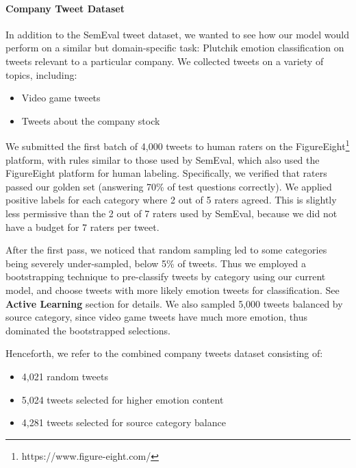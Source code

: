 \documentclass[letterpaper]{article} \usepackage{aaai19}  \usepackage{times}  \usepackage{helvet}  \usepackage{courier}  \usepackage{url}  \usepackage{graphicx}  \usepackage{booktabs}
\begin{document}
\paragraph{Company Tweet Dataset}
In addition to the SemEval tweet dataset, we wanted to see how our model would perform on a similar but domain-specific task: Plutchik emotion classification on tweets relevant to a particular company. We collected tweets on a variety of topics, including:
\begin{itemize}
    \itemsep0em
    \item Video game tweets
    \item Tweets about the company stock
\end{itemize}



We submitted the first batch of 4,000 tweets to human raters on the FigureEight\footnote{https://www.figure-eight.com/} platform, with rules similar to those used by SemEval, which also used the FigureEight platform for human labeling. Specifically, we verified that raters passed our golden set (answering 70\% of test questions correctly). We applied positive labels for each category where 2 out of 5 raters agreed. This is slightly less permissive than the 2 out of 7 raters used by SemEval, because we did not have a budget for 7 raters per tweet.

After the first pass, we noticed that random sampling led to some categories being severely under-sampled, below 5\% of tweets.
Thus we employed a bootstrapping technique to pre-classify tweets by category using our current model, and choose tweets with more likely emotion tweets for classification. See \textbf{Active Learning} section for details. We also sampled 5,000 tweets balanced by source category, since video game tweets have much more emotion, thus dominated the bootstrapped selections. 

Henceforth, we refer to the combined company tweets dataset consisting of: 
\begin{itemize}
    \itemsep0em
    \item 4,021 random tweets
    \item 5,024 tweets selected for higher emotion content
    \item 4,281 tweets selected for source category balance
\end{itemize}
\end{document}
